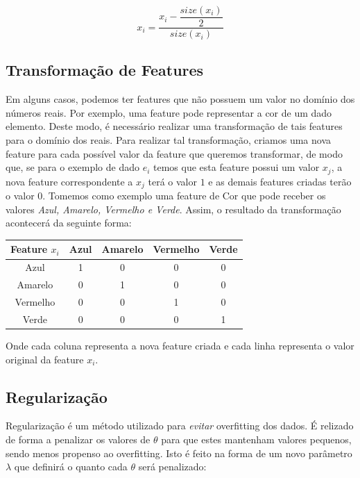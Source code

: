\documentclass[conference]{IEEEtran}
\begin{document}
\begin{equation} \label{eq:feature_norm}
x_{i} = \dfrac{x_{i} - \dfrac{size(x_{i})}{2}}{size(x_{i})}
\end{equation}

\subsection{Transformação de Features}

Em alguns casos, podemos ter features que não possuem um valor no domínio dos números reais. Por exemplo, uma feature pode representar a cor de um dado elemento. Deste modo, é necessário realizar uma transformação de tais features para o domínio dos reais. Para realizar tal transformação, criamos uma nova feature para cada possível valor da feature que queremos transformar, de modo que, se para o exemplo de dado $e_{i}$ temos que esta feature possui um valor $x_{j}$, a nova feature correspondente a $x_{j}$ terá o valor $1$ e as demais features criadas terão o valor $0$. Tomemos como exemplo uma feature de Cor que pode receber os valores \textit{Azul, Amarelo, Vermelho e Verde}. Assim, o resultado da transformação acontecerá da seguinte forma:

\begin{table}[H]
\centering
\begin{tabular}{|c|c|c|c|c|}
\hline
Feature $x_{i}$ & Azul & Amarelo & Vermelho & Verde \\ \hline
Azul            & 1    & 0       & 0        & 0     \\ \hline
Amarelo         & 0    & 1       & 0        & 0     \\ \hline
Vermelho        & 0    & 0       & 1        & 0     \\ \hline
Verde           & 0    & 0       & 0        & 1     \\ \hline
\end{tabular}
\end{table}

Onde cada coluna representa a nova feature criada e cada linha representa o valor original da feature $x_{i}$.

\subsection{Regularização}

Regularização é um método utilizado para \textit{evitar} overfitting dos dados. É relizado de forma a penalizar os valores de $\theta$ para que estes mantenham valores pequenos, sendo menos propenso ao overfitting. Isto é feito na forma de um novo parâmetro $\lambda$ que definirá o quanto cada $\theta$ será penalizado:
\end{document}
